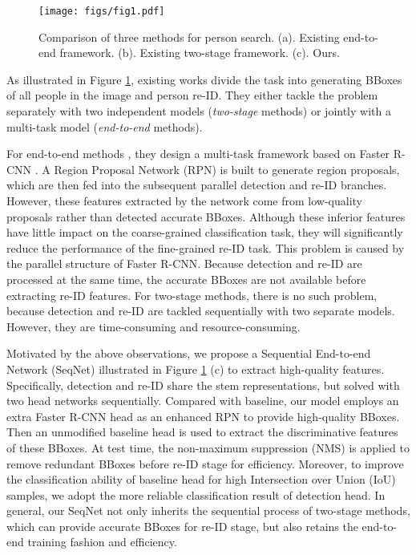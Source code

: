 \documentclass[letterpaper]{article} \usepackage{aaai21}  \usepackage{times}  \usepackage{helvet} \usepackage{courier}  \usepackage[hyphens]{url}  \usepackage{graphicx} \urlstyle{rm} \def\UrlFont{\rm}  \usepackage{natbib}  \usepackage{caption} \usepackage{multirow}
\begin{document}
\begin{figure}[t]
    \centering
    \texttt{[image: figs/fig1.pdf]}
    \caption{Comparison of three methods for person search. (a). Existing end-to-end framework. (b). Existing two-stage framework. (c). Ours.}
    \label{three_frameworks}
\end{figure}

As illustrated in Figure \ref{three_frameworks}, existing works divide the task into generating BBoxes of all people in the image and person re-ID. They either tackle the problem separately with two independent models (\textit{two-stage} methods) or jointly with a multi-task model (\textit{end-to-end} methods).

For end-to-end methods \cite{oim,ian,qeeps}, they design a multi-task framework based on Faster R-CNN \cite{faster-rcnn}. A Region Proposal Network (RPN) is built to generate region proposals, which are then fed into the subsequent parallel detection and re-ID branches. However, these features extracted by the network come from low-quality proposals rather than detected accurate BBoxes. Although these inferior features have little impact on the coarse-grained classification task, they will significantly reduce the performance of the fine-grained re-ID task. This problem is caused by the parallel structure of Faster R-CNN. Because detection and re-ID are processed at the same time, the accurate BBoxes are not available before extracting re-ID features. For two-stage methods, there is no such problem, because detection and re-ID are tackled sequentially with two separate models. However, they are time-consuming and resource-consuming.

Motivated by the above observations, we propose a Sequential End-to-end Network (SeqNet) illustrated in Figure \ref{three_frameworks} (c) to extract high-quality features. Specifically, detection and re-ID share the stem representations, but solved with two head networks sequentially. Compared with baseline, our model employs an extra Faster R-CNN head as an enhanced RPN to provide high-quality BBoxes. Then an unmodified baseline head is used to extract the discriminative features of these BBoxes. At test time, the non-maximum suppression (NMS) is applied to remove redundant BBoxes before re-ID stage for efficiency. Moreover, to improve the classification ability of baseline head for high Intersection over Union (IoU) samples, we adopt the more reliable classification result of detection head. In general, our SeqNet not only inherits the sequential process of two-stage methods, which can provide accurate BBoxes for re-ID stage, but also retains the end-to-end training fashion and efficiency.
\end{document}
